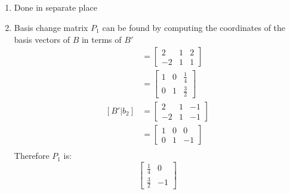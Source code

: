 \documentclass[12pt]{article}
\begin{document}
        \subsection{}
            \begin{enumerate}[label=\alph*.]
                \item Done in separate place
                \item Basis change matrix $P_1$ can be found by computing the coordinates of the basis vectors of $B$ in terms of $B'$
                    \begin{align*}
                        [B' | b_1] &=
                        \left[\begin{array}{cc|c}
                             2 & 1 & 2\\
                            -2 & 1 & 1
                        \end{array}\right]\\
                        &= \left[\begin{array}{cc|c}
                            1 & 0 & \frac{1}{4}\\
                            0 & 1 & \frac{3}{2}
                       \end{array}\right]\\
                        [B' | b_2] &=
                        \left[\begin{array}{cc|c}
                             2 & 1 & -1\\
                            -2 & 1 & -1
                        \end{array}\right]\\
                        &= \left[\begin{array}{cc|c}
                            1 & 0 & 0\\
                            0 & 1 & -1
                       \end{array}\right]\\
                    \end{align*}
                    Therefore $P_1$ is:
                        \begin{equation*}
                            \left[\begin{matrix}
                                \frac{1}{4} & 0\\
                                \frac{3}{2} & -1
                            \end{matrix}\right]
                        \end{equation*}

\end{enumerate}
\end{document}
